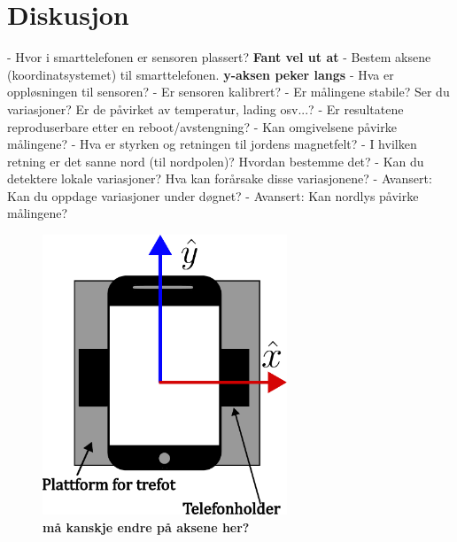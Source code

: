 \section{Diskusjon}

- Hvor i smarttelefonen er sensoren plassert?  \textbf{Fant vel ut at } \newline 
- Bestem aksene (koordinatsystemet) til smarttelefonen. \textbf{y-aksen peker langs }\newline 
- Hva er oppløsningen til sensoren? \newline
- Er sensoren kalibrert? \newline
- Er målingene stabile? Ser du variasjoner? Er de påvirket av temperatur, lading
osv...? \newline
- Er resultatene reproduserbare etter en reboot/avstengning? \newline
- Kan omgivelsene påvirke målingene?  \newline
- Hva er styrken og retningen til jordens magnetfelt?  \newline
- I hvilken retning er det sanne nord (til nordpolen)? Hvordan bestemme det? \newline
- Kan du detektere lokale variasjoner? Hva kan forårsake disse variasjonene?  \newline
- Avansert: Kan du oppdage variasjoner under døgnet? \newline
- Avansert: Kan nordlys påvirke målingene? \newline

\begin{figure}
    \centering
    \includegraphics[width=0.65\textwidth]{img/Plattform med telefoni.pdf}
    \caption{\textbf{må kanskje endre på aksene her?} 
        }
    \label{fig:telf_akser}
\end{figure}